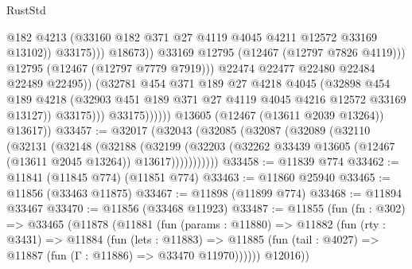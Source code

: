 \begin{lexlean}{RustStd}
\begin{coremodule}
                                            @182
                                            @4213
                                            (@33160
                                              @182
                                              @371
                                              @27
                                              @4119
                                              @4045
                                              @4211
                                              @12572
                                              @33169
                                              @13102))
                                          @33175)))
                                    @18673))
                                @33169
                                @12795
                                (@12467 (@12797 @7826 @4119)))
                              @12795
                              (@12467 (@12797 @7779 @7919)))
                            @22474
                            @22477
                            @22480
                            @22484
                            @22489
                            @22495))
                        (@32781
                          @454
                          @371
                          @189
                          @27
                          @4218
                          @4045
                          (@32898
                            @454
                            @189
                            @4218
                            (@32903 @451 @189 @371 @27 @4119 @4045 @4216 @12572 @33169 @13127))
                          @33175)))
                    @33175))))))
        @13605
        (@12467 (@13611 @2039 @13264))
        @13617))
@33457 := @32017
    (@32043
      (@32085
        (@32087
          (@32089
            (@32110
              (@32131
                (@32148
                  (@32188
                    (@32199
                      (@32203 (@32262 @33439 @13605 (@12467 (@13611 @2045 @13264)) @13617)))))))))))
@33458 := @11839 @774
@33462 := @11841 (@11845 @774) (@11851 @774)
@33463 := @11860 @25940
@33465 := @11856 (@33463 @11875)
@33467 := @11898 (@11899 @774)
@33468 := @11894 @33467
@33470 := @11856 (@33468 @11923)
@33487 := @11855
    (fun (fn : @302) =>
    @33465
      (@11878
        (@11881
          (fun (params : @11880) =>
          @11882
            (fun (rty : @3431) =>
            @11884
              (fun (lets : @11883) =>
              @11885 (fun (tail : @4027) => @11887 (fun (Γ : @11886) => @33470 @11970))))))
        @12016))

\end{coremodule}
\end{lexlean}
